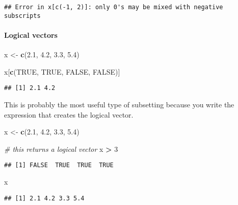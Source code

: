 \documentclass[
]{book}
\newenvironment{Shaded}{\begin{snugshade}}{\end{snugshade}}
\newcommand{\CommentTok}[1]{\textcolor[rgb]{0.56,0.35,0.01}{\textit{#1}}}
\newcommand{\DecValTok}[1]{\textcolor[rgb]{0.00,0.00,0.81}{#1}}
\newcommand{\FloatTok}[1]{\textcolor[rgb]{0.00,0.00,0.81}{#1}}
\newcommand{\KeywordTok}[1]{\textcolor[rgb]{0.13,0.29,0.53}{\textbf{#1}}}
\newcommand{\NormalTok}[1]{#1}
\newcommand{\OperatorTok}[1]{\textcolor[rgb]{0.81,0.36,0.00}{\textbf{#1}}}
\newcommand{\OtherTok}[1]{\textcolor[rgb]{0.56,0.35,0.01}{#1}}
\newcommand{\StringTok}[1]{\textcolor[rgb]{0.31,0.60,0.02}{#1}}
\begin{document}
\begin{verbatim}
## Error in x[c(-1, 2)]: only 0's may be mixed with negative subscripts
\end{verbatim}

\hypertarget{logical-vectors}{%
\paragraph{Logical vectors}\label{logical-vectors}}

\begin{Shaded}
\begin{Highlighting}[]
\NormalTok{x \textless{}{-}}\StringTok{ }\KeywordTok{c}\NormalTok{(}\FloatTok{2.1}\NormalTok{, }\FloatTok{4.2}\NormalTok{, }\FloatTok{3.3}\NormalTok{, }\FloatTok{5.4}\NormalTok{)}

\NormalTok{x[}\KeywordTok{c}\NormalTok{(}\OtherTok{TRUE}\NormalTok{, }\OtherTok{TRUE}\NormalTok{, }\OtherTok{FALSE}\NormalTok{, }\OtherTok{FALSE}\NormalTok{)]}
\end{Highlighting}
\end{Shaded}

\begin{verbatim}
## [1] 2.1 4.2
\end{verbatim}

This is probably the most useful type of subsetting because you write the expression that creates the logical vector.

\begin{Shaded}
\begin{Highlighting}[]
\NormalTok{x \textless{}{-}}\StringTok{ }\KeywordTok{c}\NormalTok{(}\FloatTok{2.1}\NormalTok{, }\FloatTok{4.2}\NormalTok{, }\FloatTok{3.3}\NormalTok{, }\FloatTok{5.4}\NormalTok{)}

\CommentTok{\# this returns a logical vector}
\NormalTok{x }\OperatorTok{\textgreater{}}\StringTok{ }\DecValTok{3}
\end{Highlighting}
\end{Shaded}

\begin{verbatim}
## [1] FALSE  TRUE  TRUE  TRUE
\end{verbatim}

\begin{Shaded}
\begin{Highlighting}[]
\NormalTok{x}
\end{Highlighting}
\end{Shaded}

\begin{verbatim}
## [1] 2.1 4.2 3.3 5.4
\end{verbatim}
\end{document}
